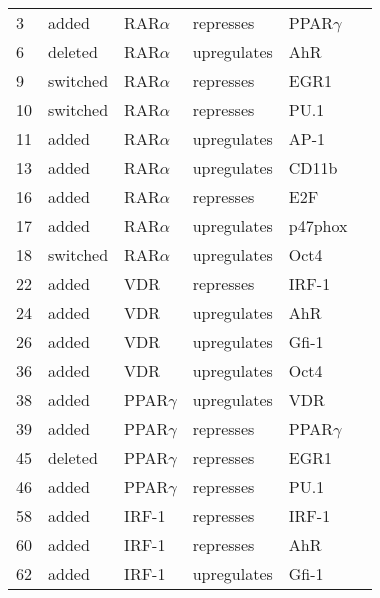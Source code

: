 

\begin{center}
\renewcommand{\arraystretch}{0.8}
\label{NB4_Model}
\begin{scriptsize}
\begin{supertabular}{|p{2 cm}|p{2cm}|p{3cm}|p{2.5cm}|p{2cm}|p{1.5cm}|}  
\hline	

3 &  added &  RAR$\alpha$ & represses &  PPAR$\gamma$ & \\
6 &  deleted &  RAR$\alpha$ & upregulates &  AhR & \\
9 &  switched &  RAR$\alpha$ & represses &  EGR1 & \\
10 &  switched &  RAR$\alpha$ & represses &  PU.1 & \\
11 &  added &  RAR$\alpha$ & upregulates &  AP-1 & \\
13 &  added &  RAR$\alpha$ & upregulates &  CD11b & \\
16 &  added &  RAR$\alpha$ & represses &  E2F & \\
17 &  added &  RAR$\alpha$ & upregulates &  p47phox & \cite{Balmer2002}\\
18 &  switched &  RAR$\alpha$ & upregulates &  Oct4 &  \cite{Ben-Shushan1995}\\
22 &  added &  VDR  & represses &  IRF-1 & \\
24 &  added &  VDR  & upregulates &  AhR & \\
26 &  added &  VDR  & upregulates &  Gfi-1 & \\
36 &  added &  VDR  & upregulates &  Oct4 & \\
38 &  added &  PPAR$\gamma$  & upregulates &  VDR & \\
39 &  added &  PPAR$\gamma$ & represses &  PPAR$\gamma$ & \\ 
45 &  deleted &  PPAR$\gamma$ & represses &  EGR1 & \\
46 &  added &  PPAR$\gamma$ & represses &  PU.1 & \\
58 &  added &  IRF-1  & represses &  IRF-1 & \\
60 &  added &  IRF-1  & represses &  AhR & \\
62 &  added &  IRF-1  & upregulates &  Gfi-1 & \\

\end{supertabular}
\end{scriptsize}
\end{center}
